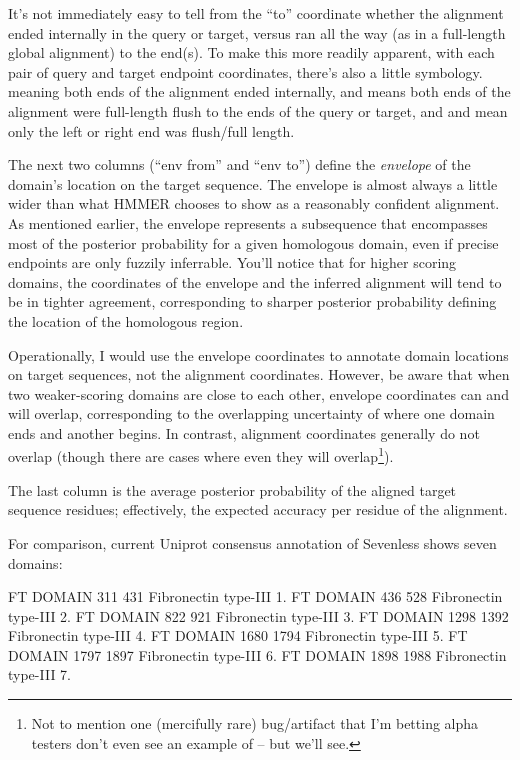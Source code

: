 It's not immediately easy to tell from the ``to'' coordinate whether
the alignment ended internally in the query or target, versus ran all
the way (as in a full-length global alignment) to the end(s). To make
this more readily apparent, with each pair of query and target
endpoint coordinates, there's also a little symbology. 
meaning both ends of the alignment ended internally, and \prog{[]}
means both ends of the alignment were full-length flush to the ends of
the query or target, and \prog{[.} and \prog{.]} mean only the left or
right end was flush/full length. 

The next two columns (``env from'' and ``env to'') define the
\emph{envelope} of the domain's location on the target sequence.  The
envelope is almost always a little wider than what HMMER chooses to
show as a reasonably confident alignment. As mentioned earlier, the
envelope represents a subsequence that encompasses most of the
posterior probability for a given homologous domain, even if precise
endpoints are only fuzzily inferrable. You'll notice that for higher
scoring domains, the coordinates of the envelope and the inferred
alignment will tend to be in tighter agreement, corresponding to
sharper posterior probability defining the location of the homologous
region. 

Operationally, I would use the envelope coordinates to annotate domain
locations on target sequences, not the alignment coordinates. However,
be aware that when two weaker-scoring domains are close to each other,
envelope coordinates can and will overlap, corresponding to the
overlapping uncertainty of where one domain ends and another begins.
In contrast, alignment coordinates generally do not overlap (though
there are cases where even they will overlap\footnote{Not to mention
one (mercifully rare) bug/artifact that I'm betting alpha testers
don't even see an example of -- but we'll see.}).

The last column is the average posterior probability of the aligned
target sequence residues; effectively, the expected accuracy per
residue of the alignment.

For comparison, current Uniprot consensus annotation of Sevenless
shows seven domains:

\begin{sreoutput}
FT   DOMAIN      311    431       Fibronectin type-III 1.
FT   DOMAIN      436    528       Fibronectin type-III 2.
FT   DOMAIN      822    921       Fibronectin type-III 3.
FT   DOMAIN     1298   1392       Fibronectin type-III 4.
FT   DOMAIN     1680   1794       Fibronectin type-III 5.
FT   DOMAIN     1797   1897       Fibronectin type-III 6.
FT   DOMAIN     1898   1988       Fibronectin type-III 7.
\end{sreoutput}

